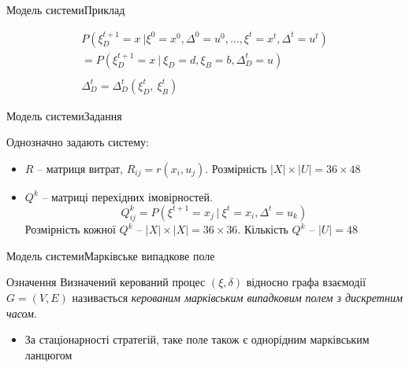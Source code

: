 \documentclass[pdf]{beamer}
\begin{document}
\begin{frame}{Модель системи}{Приклад}
	\begin{center}
	\end{center}
	
	\begin{gather*}
	P(\xi_D^{t+1} = x\ |\xi^0 = x^0, \Delta^0 = u^0, \ldots, \xi^t = x^t, \Delta^t = u^t) \\
	= P(\xi_D^{t+1} = x\ |\ \xi_D = d, \xi_B = b, \Delta_D^t = u) \\
	\\
	\Delta_D^{t} = \Delta_D^{t}(\xi_D^t,\ \xi_B^t)
	\end{gather*}
\end{frame}


\begin{frame}{Модель системи}{Задання}

Однозначно задають систему:
\begin{itemize}
	\item \(R\) – матриця витрат, \(R_{ij} = r(x_i, u_j)\). Розмірність \(|X| \times |U| = 36 \times 48\)
	\item \(Q^k\) – матриці перехідних імовірностей. 
	\[Q_{ij}^k = P(\xi^{t+1} = x_j\ |\ \xi^t = x_i, \Delta^t = u_k)\]
	Розмірність кожної \(Q^k\) – \(|X| \times |X| = 36 \times 36\). Кількість \(Q^k\) – \(|U| = 48\)
\end{itemize}

\end{frame}


\begin{frame}{Модель системи}{Марківське випадкове поле}
\begin{block}{Означення}
Визначений керований процес \((\xi, \delta)\) відносно графа взаємодії \(G = (V, E)\) називається \textit{керованим марківським випадковим полем з дискретним часом}.
\end{block}
\begin{itemize}
\item<2->{За стаціонарності стратегій, таке поле також є однорідним марківським ланцюгом}
\end{itemize}
\end{frame}
\end{document}
